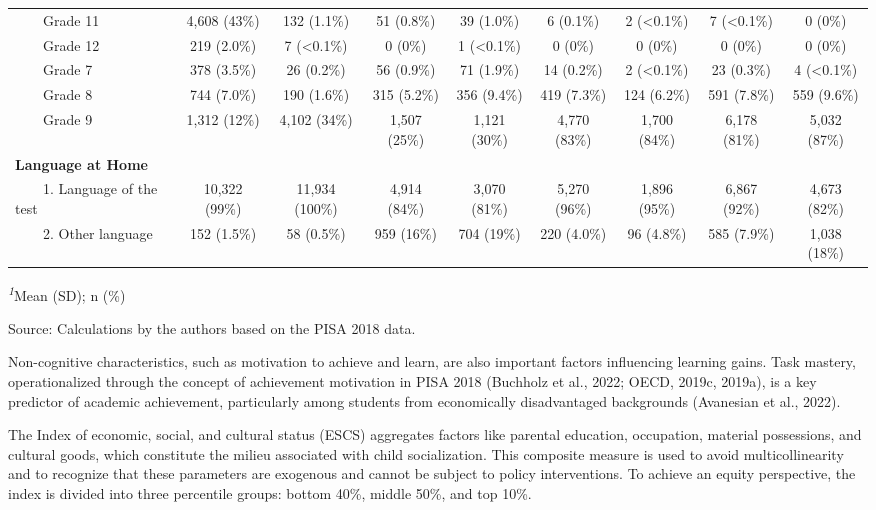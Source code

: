 \documentclass[
]{article}
\begin{document}
\begin{table}
{\begin{tabular*}{\linewidth}{@{\extracolsep{\fill}}lcccccccc}
    Grade 11 & 4,608 (43\%) & 132 (1.1\%) & 51 (0.8\%) & 39 (1.0\%) & 6 (0.1\%) & 2 (<0.1\%) & 7 (<0.1\%) & 0 (0\%) \\ 
    Grade 12 & 219 (2.0\%) & 7 (<0.1\%) & 0 (0\%) & 1 (<0.1\%) & 0 (0\%) & 0 (0\%) & 0 (0\%) & 0 (0\%) \\ 
    Grade 7 & 378 (3.5\%) & 26 (0.2\%) & 56 (0.9\%) & 71 (1.9\%) & 14 (0.2\%) & 2 (<0.1\%) & 23 (0.3\%) & 4 (<0.1\%) \\ 
    Grade 8 & 744 (7.0\%) & 190 (1.6\%) & 315 (5.2\%) & 356 (9.4\%) & 419 (7.3\%) & 124 (6.2\%) & 591 (7.8\%) & 559 (9.6\%) \\ 
    Grade 9 & 1,312 (12\%) & 4,102 (34\%) & 1,507 (25\%) & 1,121 (30\%) & 4,770 (83\%) & 1,700 (84\%) & 6,178 (81\%) & 5,032 (87\%) \\ 
{\bfseries Language at Home} &  &  &  &  &  &  &  &  \\ 
    1. Language of the test & 10,322 (99\%) & 11,934 (100\%) & 4,914 (84\%) & 3,070 (81\%) & 5,270 (96\%) & 1,896 (95\%) & 6,867 (92\%) & 4,673 (82\%) \\ 
    2. Other language & 152 (1.5\%) & 58 (0.5\%) & 959 (16\%) & 704 (19\%) & 220 (4.0\%) & 96 (4.8\%) & 585 (7.9\%) & 1,038 (18\%) \\ 
\bottomrule
\end{tabular*}
\begin{minipage}{\linewidth}
\textsuperscript{\textit{1}}Mean (SD); n (\%)\\
\end{minipage}

}

\end{table}%

Source: Calculations by the authors based on the PISA 2018 data.

Non-cognitive characteristics, such as motivation to achieve and learn,
are also important factors influencing learning gains. Task mastery,
operationalized through the concept of achievement motivation in PISA
2018 (Buchholz et al., 2022; OECD, 2019c, 2019a), is a key predictor of
academic achievement, particularly among students from economically
disadvantaged backgrounds (Avanesian et al., 2022).

The Index of economic, social, and cultural status (ESCS) aggregates
factors like parental education, occupation, material possessions, and
cultural goods, which constitute the milieu associated with child
socialization. This composite measure is used to avoid multicollinearity
and to recognize that these parameters are exogenous and cannot be
subject to policy interventions. To achieve an equity perspective, the
index is divided into three percentile groups: bottom 40\%, middle 50\%,
and top 10\%.
\end{document}
